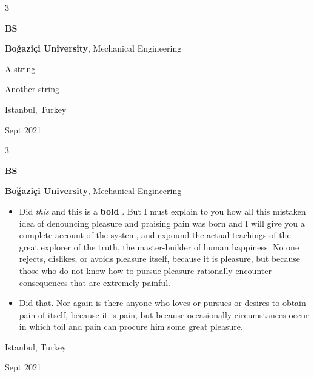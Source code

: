 \documentclass[10pt, letterpaper]{article}
\newenvironment{summary}{
    \begin{description}[
        topsep=0.10 cm,
        parsep=0.10 cm,
        partopsep=0pt,
        itemsep=0pt,
        leftmargin=0.4 cm + 10pt
    ]
}{
    \end{description}
} %
\newenvironment{highlights}{
    \begin{itemize}[
        topsep=0.10 cm,
        parsep=0.10 cm,
        partopsep=0pt,
        itemsep=0pt,
        leftmargin=0.4 cm + 10pt
    ]
}{
    \end{itemize}
} %
\newenvironment{threecolentry}[3][]{
    \onecolentry
    \def\thirdColumn{#3}
    \setcolumnwidth{1 cm, \fill, 4.5 cm}
    \begin{paracol}{3}
    {\raggedright #2} \switchcolumn
}{
    \switchcolumn \raggedleft \thirdColumn
    \end{paracol}
    \endonecolentry
} %
\let\hrefWithoutArrow\href
\renewcommand{\href}[2]{\hrefWithoutArrow{#1}{\ifthenelse{\equal{#2}{}}{ }{#2 }\raisebox{.15ex}{\footnotesize \faExternalLink*}}}
\begin{document}
        \vspace{0.2 cm}

        \begin{threecolentry}{\textbf{BS}}{
            Istanbul, Turkey

        Sept 2021
        }
            \textbf{Boğaziçi University}, Mechanical Engineering
            \begin{summary}
                \item A string
                \item Another string
            \end{summary}
        \end{threecolentry}

        \vspace{0.2 cm}

        \begin{threecolentry}{\textbf{BS}}{
            Istanbul, Turkey

        Sept 2021
        }
            \textbf{Boğaziçi University}, Mechanical Engineering
            \begin{highlights}
                \item Did \textit{this} and this is a \textbf{bold} \href{https://example.com}{link}. But I must explain to you how all this mistaken idea of denouncing pleasure and praising pain was born and I will give you a complete account of the system, and expound the actual teachings of the great explorer of the truth, the master-builder of human happiness. No one rejects, dislikes, or avoids pleasure itself, because it is pleasure, but because those who do not know how to pursue pleasure rationally encounter consequences that are extremely painful.
                \item Did that. Nor again is there anyone who loves or pursues or desires to obtain pain of itself, because it is pain, but because occasionally circumstances occur in which toil and pain can procure him some great pleasure.
            \end{highlights}
        \end{threecolentry}

        \vspace{0.2 cm}
\end{document}
